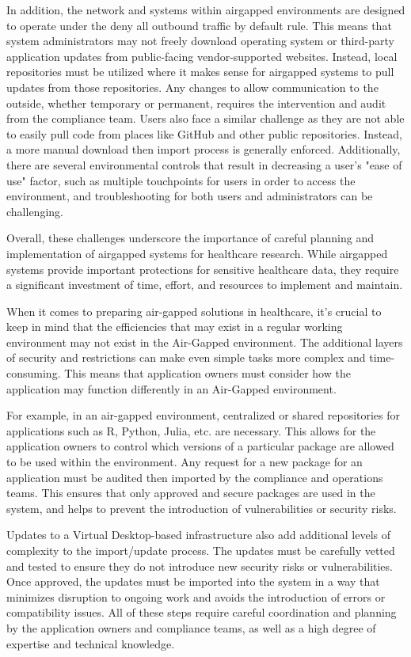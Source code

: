 \documentclass{amia}
\begin{document}
In addition, the network and systems within airgapped environments are designed to operate under the deny all outbound traffic by default rule. This means that system administrators may not freely download operating system or third-party application updates from public-facing vendor-supported websites. Instead, local repositories must be utilized where it makes sense for airgapped systems to pull updates from those repositories. Any changes to allow communication to the outside, whether temporary or permanent, requires the intervention and audit from the compliance team. Users also face a similar challenge as they are not able to easily pull code from places like GitHub and other public repositories. Instead, a more manual download then import process is generally enforced. Additionally, there are several environmental controls that result in decreasing a user's "ease of use" factor, such as multiple touchpoints for users in order to access the environment, and troubleshooting for both users and administrators can be challenging.

Overall, these challenges underscore the importance of careful planning and implementation of airgapped systems for healthcare research. While airgapped systems provide important protections for sensitive healthcare data, they require a significant investment of time, effort, and resources to implement and maintain.

When it comes to preparing air-gapped solutions in healthcare, it's crucial to keep in mind that the efficiencies that may exist in a regular working environment may not exist in the Air-Gapped environment. The additional layers of security and restrictions can make even simple tasks more complex and time-consuming. This means that application owners must consider how the application may function differently in an Air-Gapped environment.

For example, in an air-gapped environment, centralized or shared repositories for applications such as R, Python, Julia, etc. are necessary. This allows for the application owners to control which versions of a particular package are allowed to be used within the environment. Any request for a new package for an application must be audited then imported by the compliance and operations teams. This ensures that only approved and secure packages are used in the system, and helps to prevent the introduction of vulnerabilities or security risks.

Updates to a Virtual Desktop-based infrastructure also add additional levels of complexity to the import/update process. The updates must be carefully vetted and tested to ensure they do not introduce new security risks or vulnerabilities. Once approved, the updates must be imported into the system in a way that minimizes disruption to ongoing work and avoids the introduction of errors or compatibility issues. All of these steps require careful coordination and planning by the application owners and compliance teams, as well as a high degree of expertise and technical knowledge.
\end{document}
